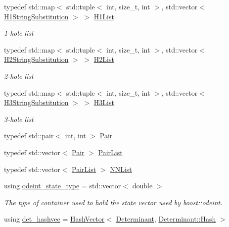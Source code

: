 \begin{DoxyCompactItemize}
\item 
typedef std\+::map$<$ std\+::tuple$<$ int, size\+\_\+t, int $>$, std\+::vector$<$ \mbox{\hyperlink{structforte_1_1_h1_string_substitution}{H1\+String\+Substitution}} $>$ $>$ \mbox{\hyperlink{namespaceforte_a963024d9b602794c861da15d743aba5f}{H1\+List}}
\begin{DoxyCompactList}\small\item\em 1-\/hole list \end{DoxyCompactList}\item 
typedef std\+::map$<$ std\+::tuple$<$ int, size\+\_\+t, int $>$, std\+::vector$<$ \mbox{\hyperlink{structforte_1_1_h2_string_substitution}{H2\+String\+Substitution}} $>$ $>$ \mbox{\hyperlink{namespaceforte_a27f0055671465d64abd83c86dfcccc5c}{H2\+List}}
\begin{DoxyCompactList}\small\item\em 2-\/hole list \end{DoxyCompactList}\item 
typedef std\+::map$<$ std\+::tuple$<$ int, size\+\_\+t, int $>$, std\+::vector$<$ \mbox{\hyperlink{structforte_1_1_h3_string_substitution}{H3\+String\+Substitution}} $>$ $>$ \mbox{\hyperlink{namespaceforte_a14d2a6006ea5c335d7258709b58702cb}{H3\+List}}
\begin{DoxyCompactList}\small\item\em 3-\/hole list \end{DoxyCompactList}\item 
typedef std\+::pair$<$ int, int $>$ \mbox{\hyperlink{namespaceforte_adfa942eeeeb54ae31f5d6f4d1e4e0641}{Pair}}
\item 
typedef std\+::vector$<$ \mbox{\hyperlink{namespaceforte_adfa942eeeeb54ae31f5d6f4d1e4e0641}{Pair}} $>$ \mbox{\hyperlink{namespaceforte_a3aa026a4f915fc1877b007cc1aab0e3b}{Pair\+List}}
\item 
typedef std\+::vector$<$ \mbox{\hyperlink{namespaceforte_a3aa026a4f915fc1877b007cc1aab0e3b}{Pair\+List}} $>$ \mbox{\hyperlink{namespaceforte_a5bff522f8c16d63f7b9d500362f6ed28}{N\+N\+List}}
\item 
using \mbox{\hyperlink{namespaceforte_ad8fa2d4b40cee55f959c09c9be68a63e}{odeint\+\_\+state\+\_\+type}} = std\+::vector$<$ double $>$
\begin{DoxyCompactList}\small\item\em The type of container used to hold the state vector used by boost\+::odeint. \end{DoxyCompactList}\item 
using \mbox{\hyperlink{namespaceforte_aee00ff2f656f0aa613d3f9f1ba01cad5}{det\+\_\+hashvec}} = \mbox{\hyperlink{class_hash_vector}{Hash\+Vector}}$<$ \mbox{\hyperlink{namespaceforte_a2076c63fd7b8732004d9e1442ce527c1}{Determinant}}, \mbox{\hyperlink{structforte_1_1_bit_array_1_1_hash}{Determinant\+::\+Hash}} $>$

\end{DoxyCompactItemize}
